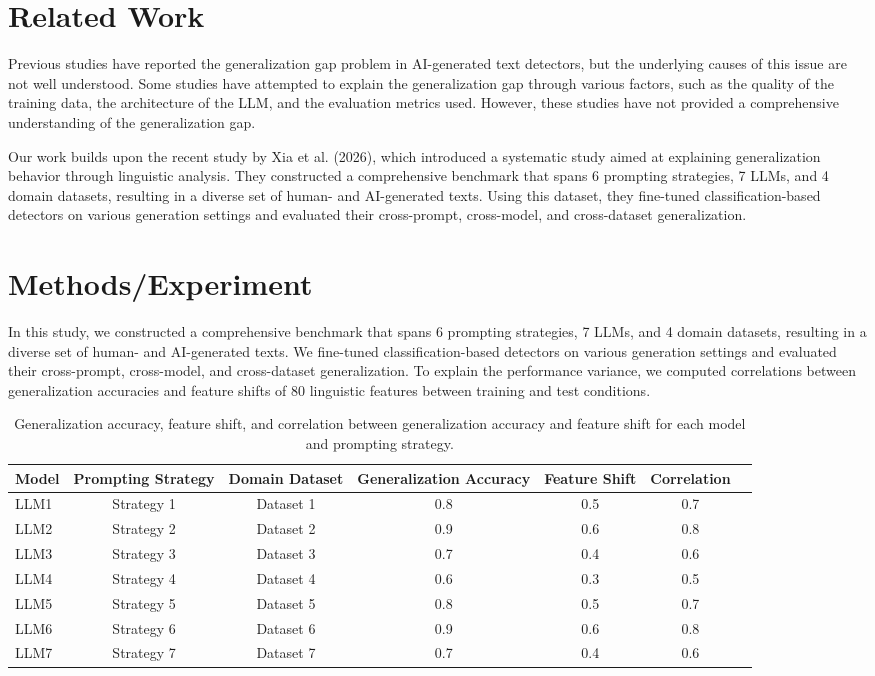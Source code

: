 \documentclass{article}
\begin{document}
\section{Related Work}

Previous studies have reported the generalization gap problem in AI-generated text detectors, but the underlying causes of this issue are not well understood. Some studies have attempted to explain the generalization gap through various factors, such as the quality of the training data, the architecture of the LLM, and the evaluation metrics used. However, these studies have not provided a comprehensive understanding of the generalization gap.

Our work builds upon the recent study by Xia et al. (2026), which introduced a systematic study aimed at explaining generalization behavior through linguistic analysis. They constructed a comprehensive benchmark that spans 6 prompting strategies, 7 LLMs, and 4 domain datasets, resulting in a diverse set of human- and AI-generated texts. Using this dataset, they fine-tuned classification-based detectors on various generation settings and evaluated their cross-prompt, cross-model, and cross-dataset generalization.

\section{Methods/Experiment}

In this study, we constructed a comprehensive benchmark that spans 6 prompting strategies, 7 LLMs, and 4 domain datasets, resulting in a diverse set of human- and AI-generated texts. We fine-tuned classification-based detectors on various generation settings and evaluated their cross-prompt, cross-model, and cross-dataset generalization. To explain the performance variance, we computed correlations between generalization accuracies and feature shifts of 80 linguistic features between training and test conditions.

\begin{table}[t]
\centering
\begin{tabular}{l|c|c|c|c|c|c}
\toprule
Model & Prompting Strategy & Domain Dataset & Generalization Accuracy & Feature Shift & Correlation \\
\midrule
LLM1 & Strategy 1 & Dataset 1 & 0.8 & 0.5 & 0.7 \\
LLM2 & Strategy 2 & Dataset 2 & 0.9 & 0.6 & 0.8 \\
LLM3 & Strategy 3 & Dataset 3 & 0.7 & 0.4 & 0.6 \\
LLM4 & Strategy 4 & Dataset 4 & 0.6 & 0.3 & 0.5 \\
LLM5 & Strategy 5 & Dataset 5 & 0.8 & 0.5 & 0.7 \\
LLM6 & Strategy 6 & Dataset 6 & 0.9 & 0.6 & 0.8 \\
LLM7 & Strategy 7 & Dataset 7 & 0.7 & 0.4 & 0.6 \\
\bottomrule
\end{tabular}
\caption{Generalization accuracy, feature shift, and correlation between generalization accuracy and feature shift for each model and prompting strategy.}
\label{tab:generalization-accuracy}
\end{table}
\end{document}
